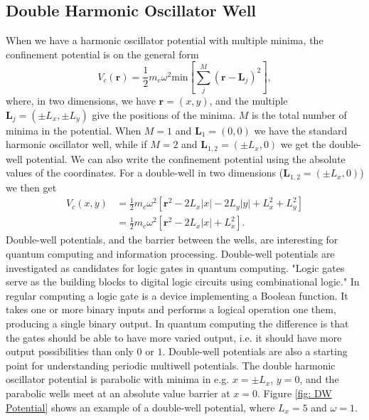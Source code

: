 \documentclass[../main.tex]{subfiles}
\begin{document}
\subsection{Double Harmonic Oscillator Well}

When we have a harmonic oscillator potential with multiple minima, the confinement potential is on the general form\cite{master project}
\begin{equation}
    V_c(\mathbf{r}) = \frac{1}{2} m_e \omega^2 \textrm{min}\left[\sum_j^M (\mathbf{r}-\mathbf{L}_j)^2\right],
\end{equation}
where, in two dimensions, we have $\mathbf{r} = (x,y)$, and the multiple $\mathbf{L}_j = (\pm L_x, \pm L_y)$ give the positions of the minima. $M$ is the total number of minima in the potential. When $M=1$ and $\mathbf{L}_1 = (0,0)$ we have the standard harmonic oscillator well, while if $M=2$ and $\mathbf{L}_{1,2} = (\pm L_x, 0)$ we get the double-well potential. We can also write the confinement potential using the absolute values of the coordinates. For a double-well in two dimensions ($\mathbf{L}_{1,2} = (\pm L_x, 0)$) we then get
\begin{equation}\label{eq: DW Potential}
\begin{split}
    V_c(x,y) &= \frac{1}{2} m_e \omega^2[\mathbf{r}^2 - 2L_x|x| - 2L_y|y| + L_x^2 + L_y^2]\\
    &= \frac{1}{2} m_e \omega^2[\mathbf{r}^2 - 2L_x|x| + L_x^2].
\end{split}
\end{equation}
Double-well potentials, and the barrier between the wells, are interesting for quantum computing and information processing. Double-well potentials are investigated as candidates for logic gates in quantum computing\cite{Multiwells}. "Logic gates serve as the building blocks to digital logic circuits using combinational logic."\cite{Lin} In regular computing a logic gate is a device implementing a Boolean function. It takes one or more binary inputs and performs a logical operation one them, producing a single binary output. In quantum computing the difference is that the gates should be able to have more varied output, i.e. it should have more output possibilities than only $0$ or $1$. Double-well potentials are also a starting point for understanding periodic multiwell potentials. The double harmonic oscillator potential is parabolic with minima in e.g. $x = \pm L_x$, $y = 0$, and the parabolic wells meet at an absolute value barrier at $x=0$. Figure \ref{fig: DW Potential} shows an example of a double-well potential, where $L_x = 5$ and $\omega = 1$.
\end{document}
